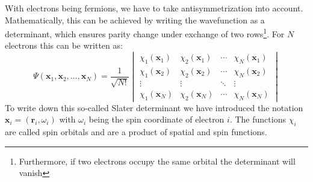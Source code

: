 With electrons being fermions, we have to take antisymmetrization into account. Mathematically, this can be achieved by writing the wavefunction as a determinant, which ensures parity change under exchange of two rows\footnote{Furthermore, if two electrons occupy the same orbital the determinant will vanish}. For $N$ electrons this can be written as:
\begin{equation}
    \Psi(\mathbf{x}_1, \mathbf{x}_2, \ldots, \mathbf{x}_N) = \frac{1}{\sqrt{N!}}
    \begin{vmatrix}
    \chi_1(\mathbf{x}_1) & \chi_2(\mathbf{x}_1) & \cdots & \chi_N(\mathbf{x}_1) \\
    \chi_1(\mathbf{x}_2) & \chi_2(\mathbf{x}_2) & \cdots & \chi_N(\mathbf{x}_2) \\
    \vdots & \vdots & \ddots & \vdots \\
    \chi_1(\mathbf{x}_N) & \chi_2(\mathbf{x}_N) & \cdots & \chi_N(\mathbf{x}_N)
    \end{vmatrix}
\end{equation}
To write down this so-called Slater determinant we have introduced the notation $\mathbf{x}_i = (\mathbf{r}_i, \omega_i)$ with $\omega_i$ being the spin coordinate of electron $i$. The functions $\chi_i$ are called spin orbitals and are a product of spatial and spin functions. 

